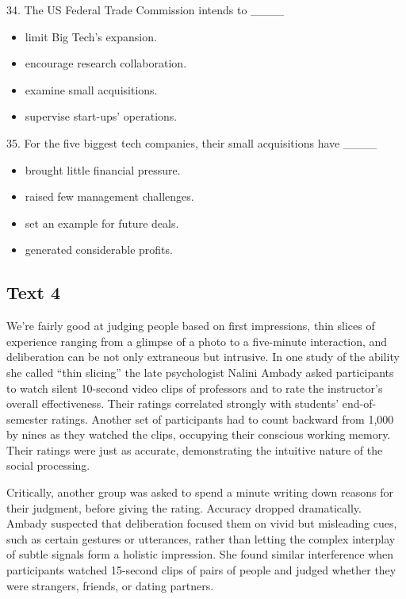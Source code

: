 \documentclass[UTF8,11pt]{ctexart}
\begin{document}
34. The US Federal Trade Commission intends to \_\_\_\_


\begin{itemize}[leftmargin=2em,itemsep=.2em,topsep=.4em]\item[A.] limit Big Tech’s expansion.
\item[B.] encourage research collaboration.
\item[C.] examine small acquisitions.
\item[D.] supervise start-ups’ operations.
\end{itemize}

35. For the five biggest tech companies, their small acquisitions have \_\_\_\_


\begin{itemize}[leftmargin=2em,itemsep=.2em,topsep=.4em]\item[A.] brought little financial pressure.
\item[B.] raised few management challenges.
\item[C.] set an example for future deals.
\item[D.] generated considerable profits.
\end{itemize}

\subsection*{\textbf{Text 4}}


We’re fairly good at judging people based on first impressions, thin slices of experience ranging from a glimpse of a photo to a five-minute interaction, and deliberation can be not only extraneous but intrusive. In one study of the ability she called “thin slicing” the late psychologist Nalini Ambady asked participants to watch silent 10-second video clips of professors and to rate the instructor’s overall effectiveness. Their ratings correlated strongly with students’ end-of-semester ratings. Another set of participants had to count backward from 1,000 by nines as they watched the clips, occupying their conscious working memory. Their ratings were just as accurate, demonstrating the intuitive nature of the social processing.


Critically, another group was asked to spend a minute writing down reasons for their judgment, before giving the rating. Accuracy dropped dramatically. Ambady suspected that deliberation focused them on vivid but misleading cues, such as certain gestures or utterances, rather than letting the complex interplay of subtle signals form a holistic impression. She found similar interference when participants watched 15-second clips of pairs of people and judged whether they were strangers, friends, or dating partners.
\end{document}
